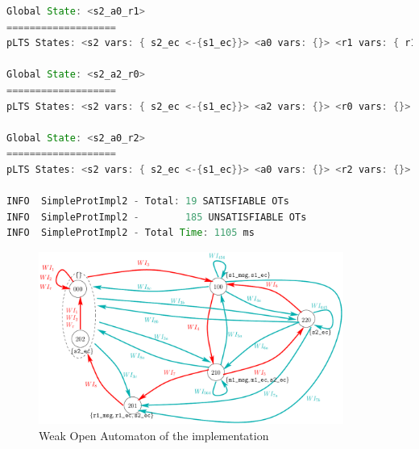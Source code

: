 \begin{lstlisting}[basicstyle=\scriptsize\ttfamily, language=java, frame=single]
Global State: <s2_a0_r1>
===================
pLTS States: <s2 vars: { s2_ec <-{s1_ec}}> <a0 vars: {}> <r1 vars: { r1_ec <-{c} r1_msg <-{msg}}>

Global State: <s2_a2_r0>
===================
pLTS States: <s2 vars: { s2_ec <-{s1_ec}}> <a2 vars: {}> <r0 vars: {}>

Global State: <s2_a0_r2>
===================
pLTS States: <s2 vars: { s2_ec <-{s1_ec}}> <a0 vars: {}> <r2 vars: {}>

INFO  SimpleProtImpl2 - Total: 19 SATISFIABLE OTs
INFO  SimpleProtImpl2 -        185 UNSATISFIABLE OTs
INFO  SimpleProtImpl2 - Total Time: 1105 ms

\end{lstlisting}






\begin{figure}[h]
   \centerline{\includegraphics[width=10cm]{XFIG/SimpleProtImpl-WOA2}}
   \caption{Weak Open Automaton of the implementation}
   \label{Appendix:ImplOA2}
 \end{figure}

